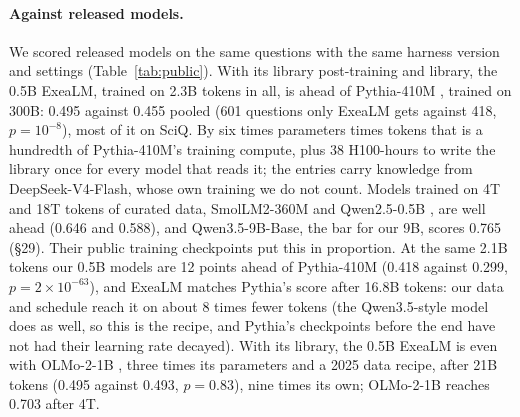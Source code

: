 \documentclass[10pt,twocolumn,letterpaper]{article}
\newcommand{\sect}[1]{\S#1}
\begin{document}
\paragraph{Against released models.}
We scored released models on the same questions with the same harness version and settings (Table~\ref{tab:public}).
With its library post-training and library, the 0.5B ExeaLM, trained on 2.3B tokens in all, is ahead of Pythia-410M \citep{biderman2023pythia}, trained on 300B: 0.495 against 0.455 pooled (601 questions only ExeaLM gets against 418, $p = 10^{-8}$), most of it on SciQ.
By six times parameters times tokens that is a hundredth of Pythia-410M's training compute, plus 38 H100-hours to write the library once for every model that reads it; the entries carry knowledge from DeepSeek-V4-Flash, whose own training we do not count.
Models trained on 4T and 18T tokens of curated data, SmolLM2-360M \citep{allal2025smollm2} and Qwen2.5-0.5B \citep{qwen2024qwen25}, are well ahead (0.646 and 0.588), and Qwen3.5-9B-Base, the bar for our 9B, scores 0.765 (\sect{29}).
Their public training checkpoints put this in proportion.
At the same 2.1B tokens our 0.5B models are 12 points ahead of Pythia-410M (0.418 against 0.299, $p = 2\times10^{-63}$), and ExeaLM matches Pythia's score after 16.8B tokens: our data and schedule reach it on about 8 times fewer tokens (the Qwen3.5-style model does as well, so this is the recipe, and Pythia's checkpoints before the end have not had their learning rate decayed).
With its library, the 0.5B ExeaLM is even with OLMo-2-1B \citep{olmo2025olmo2}, three times its parameters and a 2025 data recipe, after 21B tokens (0.495 against 0.493, $p = 0.83$), nine times its own; OLMo-2-1B reaches 0.703 after 4T.
\end{document}
